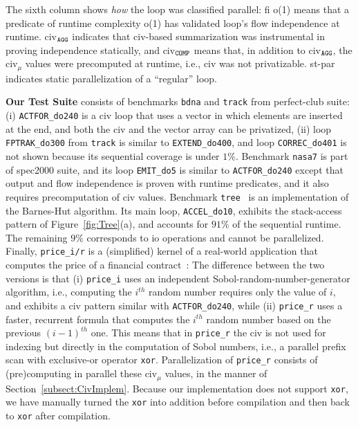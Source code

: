 \documentclass[10pt,nocopyrightspace]{sigplanconf}
\begin{document}
The sixth column shows {\em how} the loop was classified parallel: {\sc fi} {\sc o(1)}
means that a predicate of runtime complexity {\sc o(1)} has validated loop's flow
independence at runtime. {\sc civ}$_{\tt{}AGG}$ indicates that {\sc civ}-based summarization 
was instrumental in proving independence statically, and {\sc civ}$_{\tt{}COMP}$ means that,
in addition to {\sc civ}$_{\tt{}AGG}$, the {\sc civ}$_\mu$ values were precomputed
at runtime, i.e., {\sc civ} was not privatizable.  {\sc st-par} indicates static
parallelization of a ``regular'' loop. 


\vspace{1ex}

{\bf Our Test Suite} consists of benchmarks {\tt bdna} and {\tt track} 
from {\sc perfect-club} suite: (i) {\tt ACTFOR\_do240} is a {\sc civ} loop
that uses a vector in which elements are inserted at the end, and
both the {\sc civ} and the vector array can be privatized, (ii) 
loop {\tt FPTRAK\_do300} from {\tt track} is similar to {\tt EXTEND\_do400},
and loop {\tt CORREC\_do401} is not shown because 
its sequential coverage is under $1\%$. 
%
Benchmark {\tt nasa7} is part of {\sc spec2000} suite, and its loop {\tt EMIT\_do5}
is similar to {\tt ACTFOR\_do240} except that output and flow independence 
is proven with runtime predicates, and it also requires precomputation of {\sc civ} values.
%
Benchmark {\tt tree}~\cite{Treecode} is an implementation of the Barnes-Hut algorithm.
Its main loop, {\tt ACCEL\_do10}, exhibits the stack-access pattern of Figure~\ref{fig:Tree}(a),
and accounts for $91\%$ of the sequential runtime. The remaining $9\%$ corresponds to {\sc io}
operations and cannot be parallelized.
%
Finally,  {\tt price\_i/r} is a (simplified) kernel of a real-world application that
computes the price of a financial contract~\cite{LexiFiPricing}:   The difference
between the two versions is that (i) {\tt price\_i} uses an independent Sobol-random-number-generator
algorithm, i.e., computing the $i^{th}$ random number requires only the value of $i$,
and exhibits a {\sc civ} pattern similar with {\tt ACTFOR\_do240}, 
while (ii) {\tt price\_r} uses a faster, recurrent formula that computes the 
$i^{th}$ random number based on the previous $(i-1)^{th}$ one. 
This means that in {\tt price\_r} the {\sc civ} is not used for indexing
but directly in the computation of Sobol numbers, i.e., a parallel prefix 
scan with exclusive-or operator {\tt xor}. 
Parallelization of {\tt price\_r} consists of (pre)computing
in parallel these {\sc civ}$_\mu$ values, in the manner of 
Section~\ref{subsect:CivImplem}.   
%
Because our implementation does not support {\tt xor},
we have manually turned the {\tt xor} into addition before 
compilation and then back to {\tt xor} after compilation. 
\end{document}
